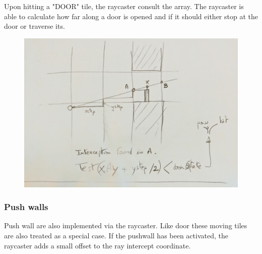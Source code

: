 \par
Upon hitting a "DOOR" tile, the raycaster consult the  array. The raycaster is able to calculate how far along a door is opened and if it should either stop at the door or traverse its.\\

\begin{minipage}{\textwidth}

\end{minipage}

\par 
 \par
\begin{figure}[H]
  \centering
 \includegraphics[width=\textwidth]{imgs/drawings/test_door.png}
\end{figure}
\par












\subsubsection{Push walls} 
Push wall are also implemented via the raycaster. Like door these moving tiles are also treated as a special case. If the pushwall has been activated, the raycaster adds a small offset to the ray intercept coordinate.

















